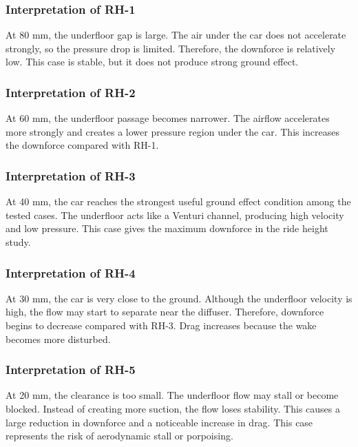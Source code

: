 \documentclass[12pt,a4paper]{article}
\begin{document}
\subsubsection{Interpretation of RH-1}

At 80 mm, the underfloor gap is large. The air under the car does not accelerate strongly, so the pressure drop is limited. Therefore, the downforce is relatively low. This case is stable, but it does not produce strong ground effect.

\subsubsection{Interpretation of RH-2}

At 60 mm, the underfloor passage becomes narrower. The airflow accelerates more strongly and creates a lower pressure region under the car. This increases the downforce compared with RH-1.

\subsubsection{Interpretation of RH-3}

At 40 mm, the car reaches the strongest useful ground effect condition among the tested cases. The underfloor acts like a Venturi channel, producing high velocity and low pressure. This case gives the maximum downforce in the ride height study.

\subsubsection{Interpretation of RH-4}

At 30 mm, the car is very close to the ground. Although the underfloor velocity is high, the flow may start to separate near the diffuser. Therefore, downforce begins to decrease compared with RH-3. Drag increases because the wake becomes more disturbed.

\subsubsection{Interpretation of RH-5}

At 20 mm, the clearance is too small. The underfloor flow may stall or become blocked. Instead of creating more suction, the flow loses stability. This causes a large reduction in downforce and a noticeable increase in drag. This case represents the risk of aerodynamic stall or porpoising.
\end{document}
